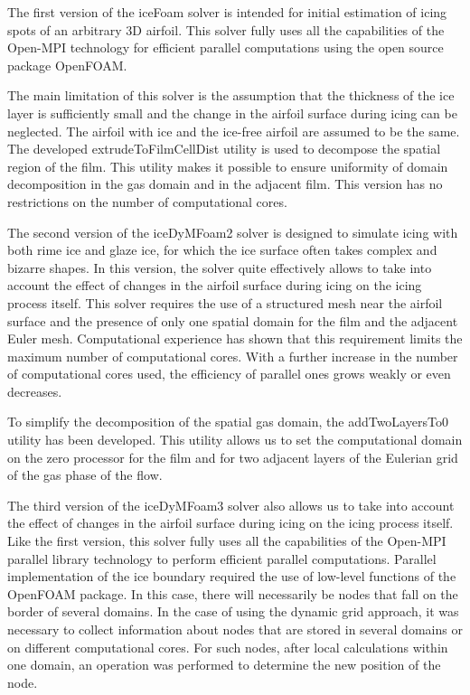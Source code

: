 \documentclass[aerospace,article,submit,moreauthors,pdftex]{Definitions/mdpi}
\begin{document}
The first version of the iceFoam solver is intended for initial estimation of icing spots of an arbitrary 3D airfoil. This solver fully uses all the capabilities of the Open-MPI technology for efficient parallel computations using the open source package OpenFOAM. 

The main limitation of this solver is the assumption that the thickness of the ice layer is sufficiently small and the change in the airfoil surface during icing can be neglected. The airfoil with ice and the ice-free airfoil are assumed to be the same. The developed extrudeToFilmCellDist utility is used to decompose the spatial region of the film. This utility makes it possible to ensure uniformity of domain decomposition in the gas domain and in the adjacent film. This version has no restrictions on the number of computational cores. 

The second version of the iceDyMFoam2 solver is designed to simulate icing with both rime ice and glaze ice, for which the ice surface often takes complex and bizarre shapes. In this version, the solver quite effectively allows to take into account the effect of changes in the airfoil surface during icing on the icing process itself. This solver requires the use of a structured mesh near the airfoil surface and the presence of only one spatial domain for the film and the adjacent Euler mesh. Computational experience has shown that this requirement limits the maximum number of computational cores. With a further increase in the number of computational cores used, the efficiency of parallel ones grows weakly or even decreases. 

To simplify the decomposition of the spatial gas domain, the addTwoLayersTo0 utility has been developed. This utility allows us to set the computational domain on the zero processor for the film and for two adjacent layers of the Eulerian grid of the gas phase of the flow. 

The third version of the iceDyMFoam3 solver also allows us to take into account the effect of changes in the airfoil surface during icing on the icing process itself. Like the first version, this solver fully uses all the capabilities of the Open-MPI parallel library technology to perform efficient parallel computations. Parallel implementation of the ice boundary required the use of low-level functions of the OpenFOAM package. In this case, there will necessarily be nodes that fall on the border of several domains. In the case of using the dynamic grid approach, it was necessary to collect information about nodes that are stored in several domains or on different computational cores. For such nodes, after local calculations within one domain, an operation was performed to determine the new position of the node. 
\end{document}
